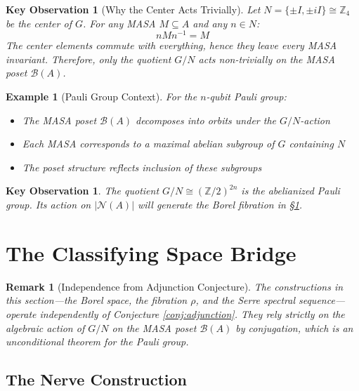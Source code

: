 \documentclass[11pt]{article}
\newtheorem{remark}[theorem]{Remark}
\newtheorem{keyobservation}[theorem]{Key Observation}
\newtheorem{example}[theorem]{Example}
\begin{document}
\begin{keyobservation}[Why the Center Acts Trivially]\label{obs:center}
Let $N = \{\pm I, \pm iI\} \cong \mathbb{Z}_4$ be the center of $G$. For any MASA $M \subseteq A$ and any $n \in N$:
\[
nMn^{-1} = M
\]
The center elements commute with everything, hence they leave every MASA invariant. Therefore, only the quotient $G/N$ acts non-trivially on the MASA poset $\mathcal{B}(A)$.
\end{keyobservation}

\begin{example}[Pauli Group Context]\label{ex:pauli-context}
For the $n$-qubit Pauli group:
\begin{itemize}
\item The MASA poset $\mathcal{B}(A)$ decomposes into orbits under the $G/N$-action
\item Each MASA corresponds to a maximal abelian subgroup of $G$ containing $N$
\item The poset structure reflects inclusion of these subgroups
\end{itemize}
\end{example}

\begin{keyobservation}\label{obs:abelianized}
The quotient $G/N \cong (\mathbb{Z}/2)^{2n}$ is the abelianized Pauli group. Its action on $|\mathcal{N}(A)|$ will generate the Borel fibration in \S\ref{classifying-space}.
\end{keyobservation}


\section{The Classifying Space Bridge}
\label{classifying-space}

\begin{remark}[Independence from Adjunction Conjecture]\label{rem:independence}
The constructions in this section---the Borel space, the fibration $\rho$, and the Serre spectral sequence---operate independently of Conjecture \ref{conj:adjunction}. They rely strictly on the algebraic action of $G/N$ on the MASA poset $\mathcal{B}(A)$ by conjugation, which is an unconditional theorem for the Pauli group.
\end{remark}

\subsection{The Nerve Construction}
\label{nerve}
\end{document}
